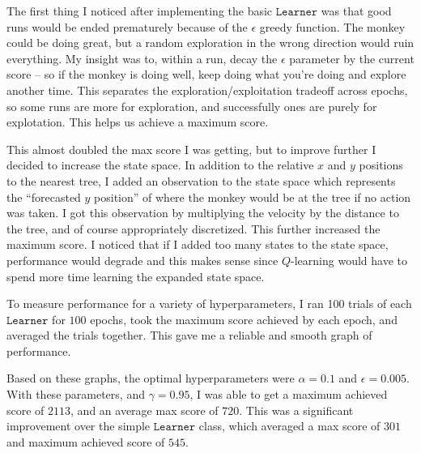\documentclass[expanded]{lkx_pset}
\begin{document}
\begin{parts}
	The first thing I noticed after implementing the basic $\texttt{Learner}$ was that good runs would be ended prematurely because of the $\epsilon$ greedy function. The monkey could be doing great, but a random exploration in the wrong direction would ruin everything. My insight was to, within a run, decay the $\epsilon$ parameter by the current score -- so if the monkey is doing well, keep doing what you're doing and explore another time. This separates the exploration/exploitation tradeoff across epochs, so some runs are more for exploration, and successfully ones are purely for explotation. This helps us achieve a maximum score.

	This almost doubled the max score I was getting, but to improve further I decided to increase the state space. In addition to the relative $x$ and $y$ positions to the nearest tree, I added an observation to the state space which represents the ``forecasted $y$ position'' of where the monkey would be at the tree if no action was taken. I got this observation by multiplying the velocity by the distance to the tree, and of course appropriately discretized. This further increased the maximum score. I noticed that if I added too many states to the state space, performance would degrade and this makes sense since $Q$-learning would have to spend more time learning the expanded state space.

	To measure performance for a variety of hyperparameters, I ran 100 trials of each $\texttt{Learner}$ for $100$ epochs, took the maximum score achieved by each epoch, and averaged the trials together. This gave me a reliable and smooth graph of performance.

	Based on these graphs, the optimal hyperparameters were $\alpha=0.1$ and $\epsilon=0.005$. With these parameters, and $\gamma=0.95$, I was able to get a maximum achieved score of $2113$, and an average max score of $720$. This was a significant improvement over the simple $\texttt{Learner}$ class, which averaged a max score of $301$ and maximum achieved score of $545$.


\end{parts}
\end{document}
